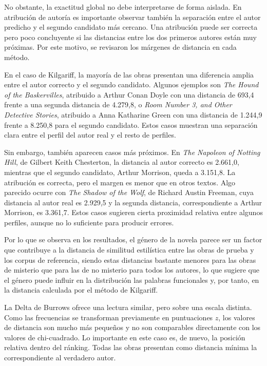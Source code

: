 \documentclass[IB]{TFUOC}%
\begin{document}
No obstante, la exactitud global no debe interpretarse de forma aislada. En atribución de autoría es importante observar también la separación entre el autor predicho y el segundo candidato más cercano. Una atribución puede ser correcta pero poco concluyente si las distancias entre los dos primeros autores están muy próximas. Por este motivo, se revisaron los márgenes de distancia en cada método.

En el caso de Kilgariff, la mayoría de las obras presentan una diferencia amplia entre el autor correcto y el segundo candidato. Algunos ejemplos son \textit{The Hound of the Baskervilles}, atribuido a Arthur Conan Doyle con una distancia de 693,4 frente a una segunda distancia de 4.279,8, o \textit{Room Number 3, and Other Detective Stories}, atribuido a Anna Katharine Green con una distancia de 1.244,9 frente a 8.250,8 para el segundo candidato. Estos casos muestran una separación clara entre el perfil del autor real y el resto de perfiles.

Sin embargo, también aparecen casos más próximos. En \textit{The Napoleon of Notting Hill}, de Gilbert Keith Chesterton, la distancia al autor correcto es 2.661,0, mientras que el segundo candidato, Arthur Morrison, queda a 3.151,8. La atribución es correcta, pero el margen es menor que en otros textos. Algo parecido ocurre con \textit{The Shadow of the Wolf}, de Richard Austin Freeman, cuya distancia al autor real es 2.929,5 y la segunda distancia, correspondiente a Arthur Morrison, es 3.361,7. Estos casos sugieren cierta proximidad relativa entre algunos perfiles, aunque no lo suficiente para producir errores.

Por lo que se observa en los resultados, el género de la novela parece ser un factor que contribuye a la distancia de similitud estilística entre las obras de prueba y los corpus de referencia, siendo estas distancias bastante menores para las obras de misterio que para las de no misterio para todos los autores, lo que sugiere que el género puede influir en la distribución las palabras funcionales y, por tanto, en la distancia calculada por el método de Kilgariff.

La Delta de Burrows ofrece una lectura similar, pero sobre una escala distinta. Como las frecuencias se transforman previamente en puntuaciones $z$, los valores de distancia son mucho más pequeños y no son comparables directamente con los valores de chi-cuadrado. Lo importante en este caso es, de nuevo, la posición relativa dentro del ránking. Todas las obras presentan como distancia mínima la correspondiente al verdadero autor.
\end{document}
